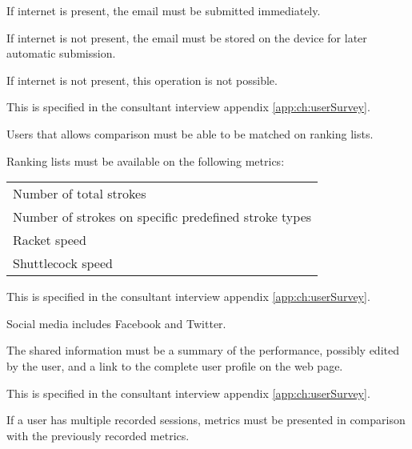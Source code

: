 If internet is present, the email must be submitted immediately.

If internet is not present, the email must be stored on the device for later automatic submission.


If internet is not present, this operation is not possible.


This  is specified in the consultant interview appendix \ref{app:ch:userSurvey}.

Users that allows comparison must be able to be matched on ranking lists.

Ranking lists must be available on the following metrics: \newline
\begin{tabularx}{\textwidth}{X}
    Number of total strokes \\
    Number of strokes on specific predefined stroke types \\
    Racket speed \\
    Shuttlecock speed \\
\end{tabularx}


This  is specified in the consultant interview appendix \ref{app:ch:userSurvey}.

Social media includes Facebook and Twitter.

The shared information must be a summary of the performance, possibly edited by the user, and a link to the complete user profile on the web page.


This  is specified in the consultant interview appendix \ref{app:ch:userSurvey}.

If a user has multiple recorded sessions, metrics must be presented in comparison with the previously recorded metrics.
